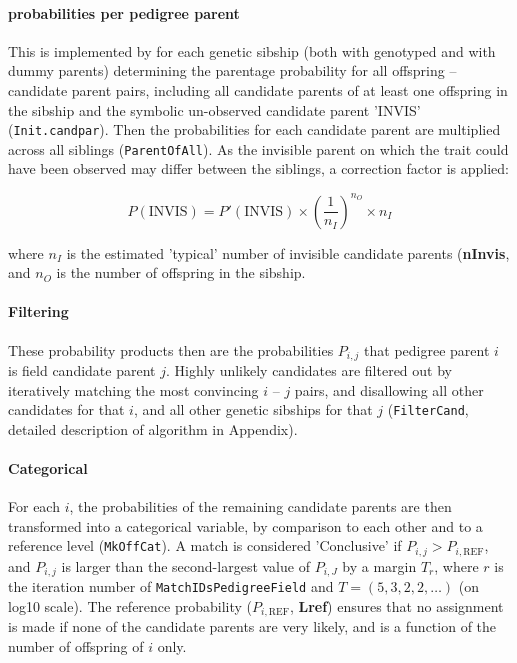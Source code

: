 \documentclass[a4paper, 12pt]{article}
\begin{document}
\paragraph{probabilities per pedigree parent}
This is implemented by for each genetic sibship (both with genotyped and with dummy parents) determining the parentage probability for all offspring -- candidate parent pairs, including all candidate parents of at least one offspring in the sibship and the symbolic un-observed candidate parent 'INVIS' (\verb+Init.candpar+). Then the probabilities for each candidate parent are multiplied across all siblings (\verb+ParentOfAll+). As the invisible parent on which the trait could have been observed may differ between the siblings, a correction factor is applied:

\begin{equation*}
	P(\text{INVIS}) = P'(\text{INVIS}) \times \left(\frac{1}{n_I}\right)^{n_O} \times n_I
\end{equation*}

where $n_I$ is the estimated 'typical' number of invisible candidate parents ({\bfseries nInvis}, and $n_O$ is the number of offspring in the sibship.

\paragraph{Filtering}
These probability products then are the probabilities $P_{i,j}$ that pedigree parent $i$ is field candidate parent $j$. Highly unlikely candidates are filtered out by iteratively matching the most convincing $i$ -- $j$ pairs, and disallowing all other candidates for that $i$, and all other genetic sibships for that $j$ (\verb+FilterCand+, detailed description of algorithm in Appendix).

\paragraph{Categorical}
For each $i$, the probabilities of the remaining candidate parents are then transformed into a categorical variable, by comparison to each other and to a reference level (\verb+MkOffCat+). A match is considered 'Conclusive' if $P_{i,j} > P_{i, \text{REF}}$, and $P_{i,j}$ is larger than the second-largest value of $P_{i,J}$ by a margin $T_r$, where $r$ is the iteration number of \verb+MatchIDsPedigreeField+ and $T=(5,3,2,2,\ldots)$ (on log10 scale). The reference probability ($P_{i, \text{REF}}$, {\bfseries Lref}) ensures that no assignment is made if none of the candidate parents are very likely, and is a function of the number of offspring of $i$ only.
\end{document}

